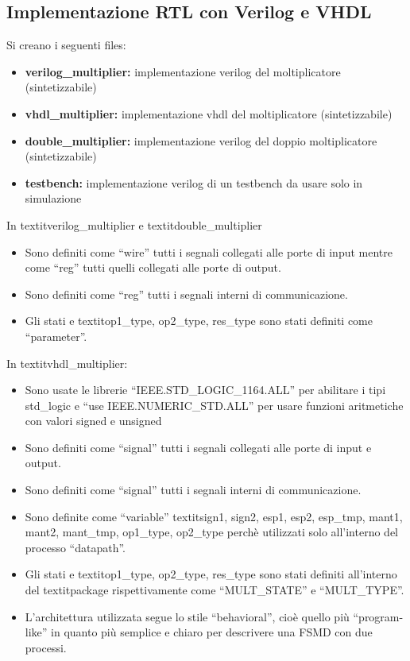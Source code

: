 \documentclass[]{IEEEtran}
\begin{document}
\subsection{Implementazione RTL con Verilog e VHDL}
Si creano i seguenti files:
\begin{itemize}
    \item \textbf{verilog\_multiplier:} implementazione verilog del moltiplicatore (sintetizzabile)
    \item \textbf{vhdl\_multiplier:} implementazione vhdl del moltiplicatore (sintetizzabile)
    \item \textbf{double\_multiplier:} implementazione verilog del doppio moltiplicatore (sintetizzabile)
    \item \textbf{testbench:} implementazione verilog di un testbench da usare solo in simulazione
\end{itemize}
In textit{verilog\_multiplier} e textit{double\_multiplier}
\begin{itemize}
    \item Sono definiti come ``wire'' tutti i segnali collegati alle porte di input mentre come ``reg'' tutti quelli collegati alle porte di output.
    \item Sono definiti come ``reg'' tutti i segnali interni di communicazione.
    \item Gli stati e textit{op1\_type, op2\_type, res\_type} sono stati definiti come ``parameter''.
\end{itemize}
In textit{vhdl\_multiplier:}
\begin{itemize}
    \item Sono usate le librerie ``IEEE.STD\_LOGIC\_1164.ALL'' per abilitare i tipi std\_logic e ``use IEEE.NUMERIC\_STD.ALL'' per usare funzioni aritmetiche con valori signed e unsigned
    \item Sono definiti come ``signal'' tutti i segnali collegati alle porte di input e output.
    \item Sono definiti come ``signal'' tutti i segnali interni di communicazione.
    \item Sono definite come ``variable'' textit{sign1, sign2, esp1, esp2, esp\_tmp, mant1, mant2, mant\_tmp, op1\_type, op2\_type} perchè utilizzati solo all'interno del processo ``datapath''.
    \item Gli stati e textit{op1\_type, op2\_type, res\_type} sono stati definiti all'interno del textit{package} rispettivamente come ``MULT\_STATE'' e ``MULT\_TYPE''.
    \item L'architettura utilizzata segue lo stile ``behavioral'', cioè quello più ``program-like'' in quanto più semplice e chiaro per descrivere una FSMD con due processi.
\end{itemize}
\end{document}
